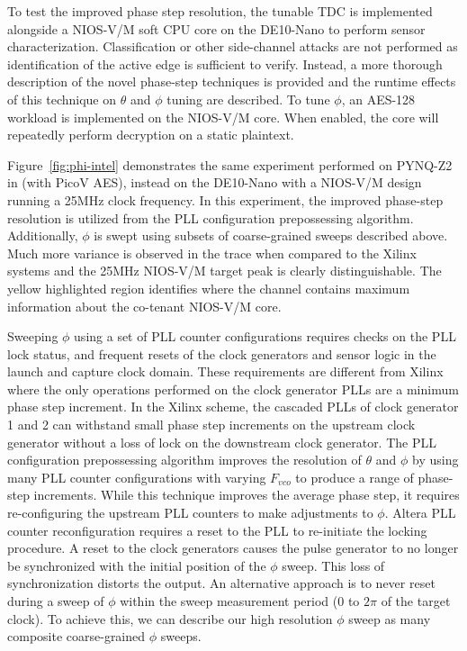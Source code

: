 To test the improved phase step resolution, the tunable TDC is
implemented alongside a NIOS-V/M soft CPU core on the DE10-Nano to
perform sensor characterization. Classification or other side-channel
attacks are not performed as identification of the active edge is
sufficient to verify. Instead, a more thorough description of the novel
phase-step techniques is provided and the runtime effects of this
technique on $\theta$ and $\phi$ tuning are described. To tune $\phi$,
an AES-128 workload is implemented on the NIOS-V/M core. When enabled,
the core will repeatedly perform decryption on a static plaintext.

Figure~\ref{fig:phi-intel} demonstrates the same experiment performed on
PYNQ-Z2 in \cite{prior} (with PicoV AES), instead on the DE10-Nano with
a NIOS-V/M design running a 25MHz clock frequency. In this experiment,
the improved phase-step resolution is utilized from the PLL
configuration prepossessing algorithm. Additionally, $\phi$ is swept
using subsets of coarse-grained sweeps described above. Much more
variance is observed in the trace when compared to the Xilinx systems
and the 25MHz NIOS-V/M target peak is clearly distinguishable. The
yellow highlighted region identifies where the channel contains maximum
information about the co-tenant NIOS-V/M core.

Sweeping $\phi$ using a set of PLL counter configurations requires
checks on the PLL lock status, and frequent resets of the clock
generators and sensor logic in the launch and capture clock domain.
These requirements are different from Xilinx where the only operations
performed on the clock generator PLLs are a minimum phase step
increment. In the Xilinx scheme, the cascaded PLLs of clock generator 1
and 2 can withstand small phase step increments on the upstream clock
generator without a loss of lock on the downstream clock generator. The
PLL configuration prepossessing algorithm improves the resolution of
$\theta$ and $\phi$ by using many PLL counter configurations with
varying $F_{vco}$ to produce a range of phase-step increments. While
this technique improves the average phase step, it requires
re-configuring the upstream PLL counters to make adjustments to $\phi$.
Altera PLL counter reconfiguration requires a reset to the PLL to
re-initiate the locking procedure. A reset to the clock generators
causes the pulse generator to no longer be synchronized with the initial
position of the $\phi$ sweep. This loss of synchronization distorts the
output. An alternative approach is to never reset during a sweep of
$\phi$ within the sweep measurement period (0 to $2\pi$ of the target
clock). To achieve this, we can describe our high resolution $\phi$
sweep as many composite coarse-grained $\phi$ sweeps.

